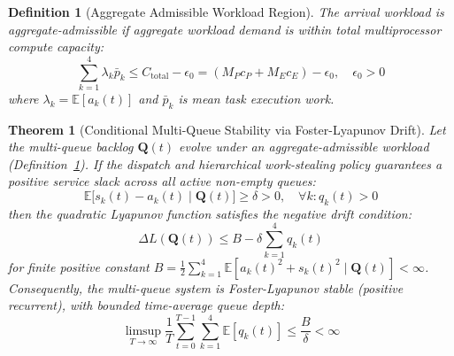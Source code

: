 \documentclass[letterpaper,twocolumn,10pt]{article}
\newtheorem{theorem}{Theorem}
\newtheorem{definition}{Definition}
\begin{document}
\begin{definition}[Aggregate Admissible Workload Region]
\label{def:class_admissible}
The arrival workload is aggregate-admissible if aggregate workload demand is within total multiprocessor compute capacity:
\begin{equation}
\label{eq:admissible_cond}
\sum_{k=1}^4 \lambda_k \bar{p}_k \le C_{\mathrm{total}} - \epsilon_0 = (M_P c_P + M_E c_E) - \epsilon_0, \quad \epsilon_0 > 0
\end{equation}
where $\lambda_k = \mathbb{E}[a_k(t)]$ and $\bar{p}_k$ is mean task execution work.
\end{definition}

\begin{theorem}[Conditional Multi-Queue Stability via Foster-Lyapunov Drift]
\label{thm:stability}
Let the multi-queue backlog $\mathbf{Q}(t)$ evolve under an aggregate-admissible workload (Definition~\ref{def:class_admissible}). If the dispatch and hierarchical work-stealing policy guarantees a positive service slack across all active non-empty queues:
\begin{equation}
\label{eq:slack_cond}
\mathbb{E}\big[ s_k(t) - a_k(t) \;\big|\; \mathbf{Q}(t) \big] \ge \delta > 0, \quad \forall k: q_k(t) > 0
\end{equation}
then the quadratic Lyapunov function satisfies the negative drift condition:
\begin{equation}
\Delta L(\mathbf{Q}(t)) \le B - \delta \sum_{k=1}^4 q_k(t)
\end{equation}
for finite positive constant $B = \frac{1}{2} \sum_{k=1}^4 \mathbb{E}[a_k(t)^2 + s_k(t)^2 \mid \mathbf{Q}(t)] < \infty$. Consequently, the multi-queue system is Foster-Lyapunov stable (positive recurrent), with bounded time-average queue depth:
\begin{equation}
\limsup_{T \to \infty} \frac{1}{T} \sum_{t=0}^{T-1} \sum_{k=1}^4 \mathbb{E}[q_k(t)] \le \frac{B}{\delta} < \infty
\end{equation}
\end{theorem}
\end{document}
